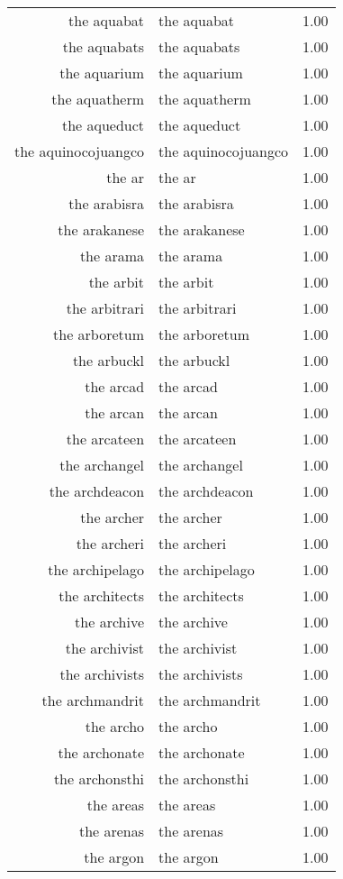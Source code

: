 \begin{table}[ht]
\begin{tabular}{rlr}
  the aquabat & the aquabat & 1.00 \\ 
  the aquabats & the aquabats & 1.00 \\ 
  the aquarium & the aquarium & 1.00 \\ 
  the aquatherm & the aquatherm & 1.00 \\ 
  the aqueduct & the aqueduct & 1.00 \\ 
  the aquinocojuangco & the aquinocojuangco & 1.00 \\ 
  the ar & the ar & 1.00 \\ 
  the arabisra & the arabisra & 1.00 \\ 
  the arakanese & the arakanese & 1.00 \\ 
  the arama & the arama & 1.00 \\ 
  the arbit & the arbit & 1.00 \\ 
  the arbitrari & the arbitrari & 1.00 \\ 
  the arboretum & the arboretum & 1.00 \\ 
  the arbuckl & the arbuckl & 1.00 \\ 
  the arcad & the arcad & 1.00 \\ 
  the arcan & the arcan & 1.00 \\ 
  the arcateen & the arcateen & 1.00 \\ 
  the archangel & the archangel & 1.00 \\ 
  the archdeacon & the archdeacon & 1.00 \\ 
  the archer & the archer & 1.00 \\ 
  the archeri & the archeri & 1.00 \\ 
  the archipelago & the archipelago & 1.00 \\ 
  the architects & the architects & 1.00 \\ 
  the archive & the archive & 1.00 \\ 
  the archivist & the archivist & 1.00 \\ 
  the archivists & the archivists & 1.00 \\ 
  the archmandrit & the archmandrit & 1.00 \\ 
  the archo & the archo & 1.00 \\ 
  the archonate & the archonate & 1.00 \\ 
  the archonsthi & the archonsthi & 1.00 \\ 
  the areas & the areas & 1.00 \\ 
  the arenas & the arenas & 1.00 \\ 
  the argon & the argon & 1.00 \\ 

\end{tabular}
\end{table}
